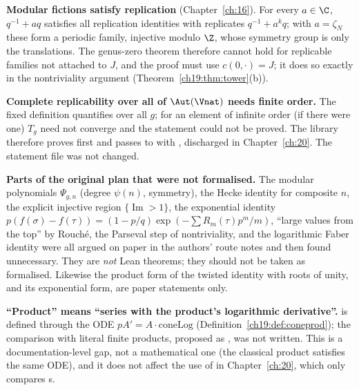 \begin{warning}
\textbf{Modular fictions satisfy replication} (Chapter~\ref{ch:16}).  For every $a\in\C$, $q^{-1}+aq$ satisfies all
replication identities with replicates $q^{-1}+a^kq$; with $a=\zeta_N$ these form a periodic family, injective modulo $\Z$, whose symmetry group is
only the translations.  The genus-zero theorem therefore cannot hold for replicable families not attached to $J$, and the proof must use
$c(0,\cdot)=J$; it does so exactly in the nontriviality argument (Theorem~\ref{ch19:thm:tower}(b)).
\end{warning}

\begin{warning}
\textbf{Complete replicability over all of $\Aut(\Vnat)$ needs finite order.}  The fixed definition
 quantifies over all $g$; for an element of infinite order (if there were one) $T_g$ need not converge and the
statement could not be proved.  The library therefore proves  first and passes to
 with , discharged in Chapter~\ref{ch:20}.  The statement file was not changed.
\end{warning}

\begin{warning}
\textbf{Parts of the original plan that were not formalised.}  The modular polynomials $\Psi_{g,n}$
(degree $\psi(n)$, symmetry), the Hecke identity for composite $n$, the explicit injective region $\{\operatorname{Im}>1\}$, the exponential identity
$p(f(\sigma)-f(\tau))=(1-p/q)\exp(-\sum R_m(\tau)p^m/m)$, ``large values from the top'' by Rouch\'e, the Parseval step of nontriviality, and the
logarithmic Faber identity were all argued on paper in the authors' route notes and then found unnecessary.  They
are \emph{not} Lean theorems; they should not be taken as formalised.  Likewise the product form of the
twisted identity with roots of unity, and its exponential form, are paper statements only.
\end{warning}

\begin{warning}
\textbf{``Product'' means ``series with the product's logarithmic derivative''.}   is defined through the ODE $pA'=A\cdot
\mathrm{coneLog}$ (Definition~\ref{ch19:def:coneprod}); the comparison with literal finite products, proposed as , was
not written.  This is a documentation-level gap, not a mathematical one (the classical product satisfies the same ODE), and it does not affect the
use of  in Chapter~\ref{ch:20}, which only compares s.
\end{warning}

